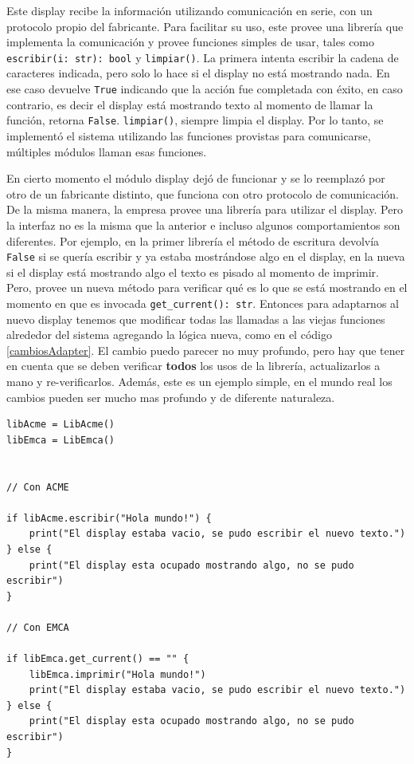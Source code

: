 Este display recibe la información utilizando comunicación en serie, con un protocolo propio del fabricante. Para facilitar su uso, este provee una librería que implementa la comunicación y provee funciones simples de usar, tales como \verb|escribir(i: str): bool| y \verb|limpiar()|. La primera intenta escribir la cadena de caracteres indicada, pero solo lo hace si el display no está mostrando nada. En ese caso devuelve \verb|True| indicando que la acción fue completada con éxito, en caso contrario, es decir el display está mostrando texto al momento de llamar la función, retorna \verb|False|. \verb|limpiar()|, siempre limpia el display. Por lo tanto, se implementó el sistema utilizando las funciones provistas para comunicarse, múltiples módulos llaman esas funciones.

En cierto momento el módulo display dejó de funcionar y se lo reemplazó por otro de un fabricante distinto, que funciona con otro protocolo de comunicación. De la misma manera, la empresa provee una librería para utilizar el display. Pero la interfaz no es la misma que la anterior e incluso algunos comportamientos son diferentes. Por ejemplo, en la primer librería el método de escritura devolvía \verb|False| si se quería escribir y ya estaba mostrándose algo en el display, en la nueva si el display está mostrando algo el texto es pisado al momento de imprimir. Pero, provee un nueva método para verificar qué es lo que se está mostrando en el momento en que es invocada \verb|get_current(): str|. Entonces para adaptarnos al nuevo display tenemos que modificar todas las llamadas a las viejas funciones alrededor del sistema agregando la lógica nueva, como en el código \ref{cambiosAdapter}. El cambio puedo parecer no muy profundo, pero hay que tener en cuenta que se deben verificar \textbf{todos} los usos de la librería, actualizarlos a mano y re-verificarlos. Además, este es un ejemplo simple, en el mundo real los cambios pueden ser mucho mas profundo y de diferente naturaleza.

\begin{lstlisting}[label={cambiosAdapter}, caption=Ejemplo de modificaciones necesarias para adaptar la nueva librería.]
libAcme = LibAcme()
libEmca = LibEmca()


// Con ACME

if libAcme.escribir("Hola mundo!") {
	print("El display estaba vacio, se pudo escribir el nuevo texto.")
} else {
	print("El display esta ocupado mostrando algo, no se pudo escribir")
}

// Con EMCA

if libEmca.get_current() == "" {
	libEmca.imprimir("Hola mundo!")
	print("El display estaba vacio, se pudo escribir el nuevo texto.")
} else {
	print("El display esta ocupado mostrando algo, no se pudo escribir")
}


\end{lstlisting}


